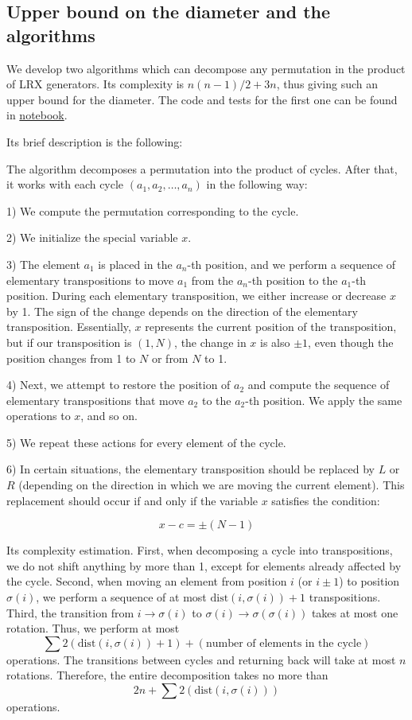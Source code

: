 \documentclass[atmp]{ipart_v1}
\numberwithin{equation}{section}
\theoremstyle{plain}%
\begin{document}
\subsection{Upper bound on the diameter and the algorithms }
We develop two algorithms which can decompose any permutation in the product of LRX generators. Its complexity is  $n(n-1)/2+3n$, thus giving such an upper bound for the diameter. The code and tests for the first one can be found in \href{https://www.kaggle.com/code/mixnota/article-project}{notebook}.

Its brief description is the following:

The algorithm decomposes a permutation into the product of cycles. After that, it works with each cycle \( (a_1, a_2, \dots, a_n) \) in the following way:

1) We compute the permutation corresponding to the cycle.

2) We initialize the special variable \( x \).

3) The element \( a_1 \) is placed in the \( a_n \)-th position, and we perform a sequence of elementary transpositions to move \( a_1 \) from the \( a_n \)-th position to the \( a_1 \)-th position. During each elementary transposition, we either increase or decrease \( x \) by 1. The sign of the change depends on the direction of the elementary transposition. Essentially, \( x \) represents the current position of the transposition, but if our transposition is \( (1, N) \), the change in \( x \) is also \( \pm1 \), even though the position changes from 1 to \( N \) or from \( N \) to 1.

4) Next, we attempt to restore the position of \( a_2 \) and compute the sequence of elementary transpositions that move \( a_2 \) to the \( a_2 \)-th position. We apply the same operations to \( x \), and so on.

5) We repeat these actions for every element of the cycle.

6) In certain situations, the elementary transposition should be replaced by \( L \) or \( R \) (depending on the direction in which we are moving the current element). This replacement should occur if and only if the variable \( x \) satisfies the condition:

\[
x - c = \pm (N - 1)
\]


Its complexity estimation.
First, when decomposing a cycle into transpositions, we do not shift anything by more than 1, except for elements already affected by the cycle.
Second, when moving an element from position \( i \) (or \( i \pm 1 \)) to position \( \sigma(i) \), we perform a sequence of at most \( \text{dist}(i, \sigma(i)) + 1 \) transpositions.
Third, the transition from \( i \to \sigma(i) \) to \( \sigma(i) \to \sigma(\sigma(i)) \) takes at most one rotation.
Thus, we perform at most  
\[
\sum 2(\text{dist}(i, \sigma(i)) + 1) + (\text{number of elements in the cycle})
\]
operations. The transitions between cycles and returning back will take at most \( n \) rotations.
Therefore, the entire decomposition takes no more than  
\[
2n + \sum 2(\text{dist}(i, \sigma(i)))
\]
operations.
\end{document}
